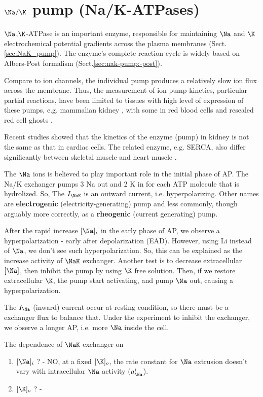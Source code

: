 \chapter{$\Na/\K$ pump (Na/K-ATPases)}
\label{chap:NaK_pump}

$\Na$,$\K$-ATPase is an important enzyme, responsible for maintaining $\Na$ and
$\K$ electrochemical potential gradients across the plasma membranes
(Sect.\ref{sec:NaK_pump}).
The enzyme's complete reaction cycle is widely based on Albers-Post formalism
(Sect.\ref{sec:nak-pump:-post}). 

Compare to ion channels, the individual pump produces a relatively slow ion flux
across the membrane. Thus, the measurement of ion pump kinetics, particular
partial reactions, have been limited to tissues with high level of expression of
these pumps, e.g. mammalian kidney \citep{jorgensen1974, jorgensen1974i},
with some in red blood cells and resealed red cell ghosts \citep{sachs1989}.

Recent studies showed that the kinetics of the enzyme (pump) in kidney is not
the same as that in cardiac cells. The related enzyme, e.g. SERCA, also differ
significantly between skeletal muscle and heart muscle \citep{cable1988}. 


The $\Na$ ions is believed to play important role in the initial phase
of AP. The Na/K exchanger pumps 3 Na out and 2 K in for each ATP
molecule that is hydrolized. So, The $I_\NaK$ is an outward current,
i.e. hyperpolarizing. Other names are {\bf electrogenic}
(electricity-generating) pump and less commonly, though arguably more
correctly, as a {\bf rheogenic} (current generating) pump.

After the rapid increase $[\Na]_i$ in the early phase of AP, we
observe a hyperpolarization - early after depolarization
(EAD). However, using Li instead of $\Na$, we don't see such
hyperpolarization. So, this can be explained as the increase activity
of $\NaK$ exchanger. Another test is to decrease extracellular
$[\Na]$, then inhibit the pump by using $\K$ free solution. Then, if
we restore extracellular $\K$, the pump start activating, and pump
$\Na$ out, causing a hyperpolarization.

The $I_\Na$ (inward) current occur at resting condition, so there must
be a exchanger flux to balance that. Under the experiment to inhibit
the exchanger, we observe a longer AP, i.e. more $\Na$ inside the
cell. 

The dependence of $\NaK$ exchanger on 
\begin{enumerate}
\item $[\Na]_i$ ? - NO, at a fixed $[\K]_o$, the rate constant for
  $\Na$ extrusion doesn't vary with intracellular $\Na$ activity
  ($a^i_\Na$). 


\item $[\K]_o$ ? - 
\end{enumerate}


